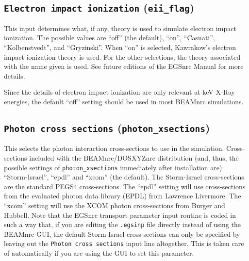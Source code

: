 \documentclass[12pt,twoside]{article}      %
\begin{document}
\subsection{ {\tt Electron impact ionization} ({\tt eii\_flag})}

This input determines what, if any, theory is used to simulate
electron impact ionization.  The possible values are
``off'' (the default), ``on'', ``Casnati'', ``Kolbenstvedt'',
and ``Gryzinski''.  When ``on'' is selected, Kawrakow's electron
impact ionization theory\cite{Ka02b} is used.  For the other selections,
the theory associated with the name given is used.  See future editions
of the EGSnrc Manual\cite{KR03} for more details.

Since the details of electron impact ionization are only relevant
at keV X-Ray energies, the default ``off'' setting should be used
in most BEAMnrc simulations.

\subsection{ {\tt Photon cross sections} ({\tt photon\_xsections})}

This selects the photon interaction cross-sections to use in
the simulation.  Cross-sections included with the BEAMnrc/DOSXYZnrc
distribution (and, thus, the possible settings of
{\tt photon\_xsections} immediately after installation are):
``Storm-Israel'', ``epdl'' and ``xcom'' (the default).
The Storm-Israel cross-sections are the standard PEGS4 cross-sections.
The ``epdl'' setting will use cross-sections from
the evaluated photon data library (EPDL) from Lawrence Livermore\cite{Cu90}.
The ``xcom'' setting will use the XCOM
photon cross-sections from Burger and Hubbell\cite{BH87}.  Note that
the EGSnrc transport parameter input routine is coded in such a way that,
if you are editing the {\tt .egsinp} file directly instead of using
the BEAMnrc GUI, the default Storm-Israel cross-sections can only be
specified by leaving out the {\tt Photon cross sections} input line
altogether.  This is taken care of automatically if you are using the
GUI to set this parameter.
\end{document}
